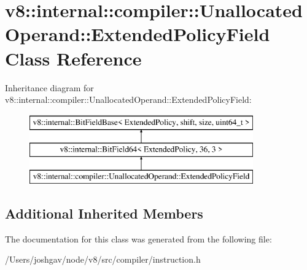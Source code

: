 \hypertarget{classv8_1_1internal_1_1compiler_1_1_unallocated_operand_1_1_extended_policy_field}{}\section{v8\+:\+:internal\+:\+:compiler\+:\+:Unallocated\+Operand\+:\+:Extended\+Policy\+Field Class Reference}
\label{classv8_1_1internal_1_1compiler_1_1_unallocated_operand_1_1_extended_policy_field}
Inheritance diagram for v8\+:\+:internal\+:\+:compiler\+:\+:Unallocated\+Operand\+:\+:Extended\+Policy\+Field\+:\begin{figure}[H]
\begin{center}
\leavevmode
\includegraphics[height=3.000000cm]{classv8_1_1internal_1_1compiler_1_1_unallocated_operand_1_1_extended_policy_field}
\end{center}
\end{figure}
\subsection*{Additional Inherited Members}


The documentation for this class was generated from the following file\+:\begin{DoxyCompactItemize}
\item 
/\+Users/joshgav/node/v8/src/compiler/instruction.\+h\end{DoxyCompactItemize}
